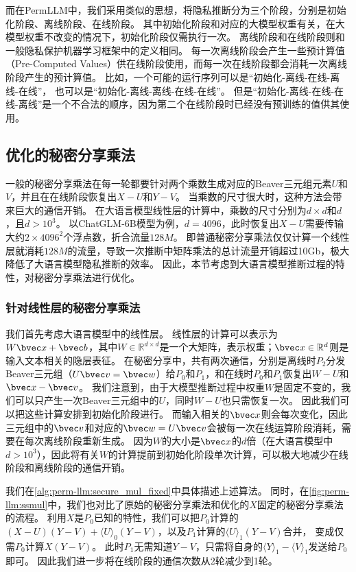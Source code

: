 %
而在PermLLM中，我们采用类似的思想，将隐私推断分为三个阶段，分别是初始化阶段、离线阶段、在线阶段。
%
其中初始化阶段和对应的大模型权重有关，在大模型权重不改变的情况下，初始化阶段仅需执行一次。
%
离线阶段和在线阶段则和一般隐私保护机器学习框架中的定义相同。
每一次离线阶段会产生一些预计算值（Pre-Computed Values）供在线阶段使用，而每一次在线阶段都会消耗一次离线阶段产生的预计算值。
%
比如，一个可能的运行序列可以是“初始化-离线-在线-离线-在线”，
也可以是“初始化-离线-离线-在线-在线”。
但是“初始化-离线-在线-在线-离线”是一个不合法的顺序，因为第二个在线阶段时已经没有预训练的值供其使用。

\subsection{优化的秘密分享乘法}
一般的秘密分享乘法在每一轮都要针对两个乘数生成对应的Beaver三元组元素$U$和$V$，并且在在线阶段恢复出$X - U$和$Y- V$。
当乘数的尺寸很大时，这种方法会带来巨大的通信开销。
%
在大语言模型线性层的计算中，乘数的尺寸分别为$d\times d$和$d$，且$d > 10^3$。
以ChatGLM-6B模型为例，$d = 4096$，此时恢复出$X - U$需要传输大约$2\times 4096^2$个浮点数，折合流量$128M$。
%
即普通秘密分享乘法仅仅计算一个线性层就消耗$128M$的流量，导致一次推断中矩阵乘法的总计流量开销超过10Gb，极大降低了大语言模型隐私推断的效率。
%
因此，本节考虑到大语言模型推断过程的特性，对秘密分享乘法进行优化。

%

\subsubsection{针对线性层的秘密分享乘法}
我们首先考虑大语言模型中的线性层。
%
线性层的计算可以表示为$W \bvec x + \bvec b$，其中$W \in \mathbb R^{d\times d}$是一个大矩阵，表示权重；$\bvec x \in \mathbb R^{d}$则是输入文本相关的隐层表征。
%
在秘密分享中，共有两次通信，分别是离线时$P_2$分发Beaver三元组（$U\bvec v = \bvec w$）给$P_0$和$P_1$，和在线时$P_0$和$P_1$恢复出$W - U$和$\bvec x - \bvec v$。
%
我们注意到，由于大模型推断过程中权重$W$是固定不变的，我们可以只产生一次Beaver三元组中的$U$，同时$W - U$也只需恢复一次。
因此我们可以把这些计算安排到初始化阶段进行。
%
而输入相关的$\bvec x$则会每次变化，因此三元组中的$\bvec v$和对应的$\bvec w=U\bvec v$会被每一次在线运算阶段消耗，需要在每次离线阶段重新生成。
%
因为$W$的大小是$\bvec x$的$d$倍（在大语言模型中$d > 10^3$），因此将有关$W$的计算提前到初始化阶段单次计算，可以极大地减少在线阶段和离线阶段的通信开销。


我们在\autoref{alg:perm-llm:secure_mul_fixed}中具体描述上述算法。
同时，在\autoref{fig:perm-llm:ssmul}中，我们也对比了原始的秘密分享乘法和优化的$X$固定的秘密分享乘法的流程。
%
利用$X$是$P_0$已知的特性，我们可以把$P_0$计算的$(X-U)(Y-V) + \langle U \rangle_0(Y-V)$，以及$P_1$计算的$\langle U \rangle_1(Y-V)$合并，
变成仅需$P_0$计算$X(Y-V)$。
%
此时$P_1$无需知道$Y-V$，只需将自身的$\langle Y \rangle_1 - \langle V \rangle_1$发送给$P_0$即可。
因此我们进一步将在线阶段的通信次数从2轮减少到1轮。
%


